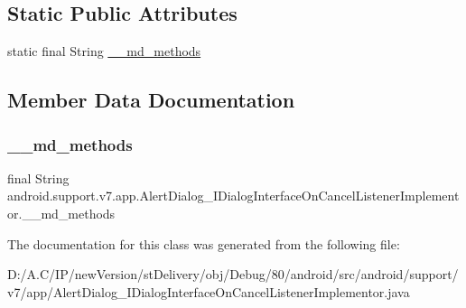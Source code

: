 \subsection*{Static Public Attributes}
\begin{DoxyCompactItemize}
\item 
static final String \hyperlink{classandroid_1_1support_1_1v7_1_1app_1_1_alert_dialog___i_dialog_interface_on_cancel_listener_implementor_aad0667e101becd304b276b6492f459d1}{\+\_\+\+\_\+md\+\_\+methods}
\end{DoxyCompactItemize}


\subsection{Member Data Documentation}
\mbox{\label{classandroid_1_1support_1_1v7_1_1app_1_1_alert_dialog___i_dialog_interface_on_cancel_listener_implementor_aad0667e101becd304b276b6492f459d1}} 
\subsubsection{\texorpdfstring{\+\_\+\+\_\+md\+\_\+methods}{\_\_md\_methods}}
{\footnotesize\ttfamily final String android.\+support.\+v7.\+app.\+Alert\+Dialog\+\_\+\+I\+Dialog\+Interface\+On\+Cancel\+Listener\+Implementor.\+\_\+\+\_\+md\+\_\+methods\hspace{0.3cm}{\ttfamily [static]}}



The documentation for this class was generated from the following file\+:\begin{DoxyCompactItemize}
\item 
D\+:/\+A.\+C/\+I\+P/new\+Version/st\+Delivery/obj/\+Debug/80/android/src/android/support/v7/app/Alert\+Dialog\+\_\+\+I\+Dialog\+Interface\+On\+Cancel\+Listener\+Implementor.\+java\end{DoxyCompactItemize}
